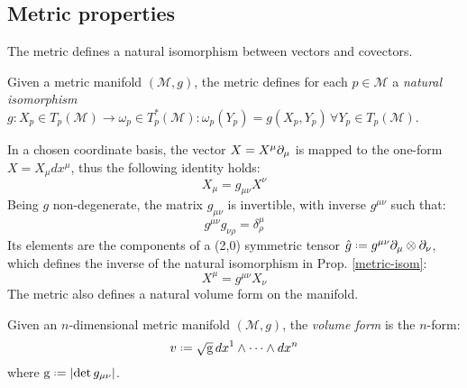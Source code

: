 \subsection{Metric properties}

The metric defines a natural isomorphism between vectors and covectors.

\begin{proposition}\label{metric-isom}
  Given a metric manifold $ (\mathcal{M},g) $, the metric defines for each $ p \in \mathcal{M} $ a \textit{natural isomorphism} $ g : X_p \in T_p (\mathcal{M}) \rightarrow \omega_p \in T^*_p (\mathcal{M}) : \omega_p(Y_p) = g(X_p,Y_p) \,\forall Y_p \in T_p (\mathcal{M}) $.
\end{proposition}

In a chosen coordinate basis, the vector $ X = X^{\mu} \partial_{\mu} $ is mapped to the one-form $ X = X_{\mu} dx^{\mu} $, thus the following identity holds:
\begin{equation}
  X_{\mu} = g_{\mu \nu} X^{\nu}
  \label{eq:3.10}
\end{equation}
Being $ g $ non-degenerate, the matrix $ g_{\mu \nu} $ is invertible, with inverse $ g^{\mu \nu} $ such that:
\begin{equation}
  g^{\mu \nu} g_{\nu \rho} = \delta^{\mu}_{\rho}
  \label{eq:3.11}
\end{equation}
Its elements are the components of a (2,0) symmetric tensor $ \hat{g} \defeq g^{\mu \nu} \pa_{\mu} \otimes \pa_{\nu} $, which defines the inverse of the natural isomorphism in Prop. \ref{metric-isom}:
\begin{equation}
  X^{\mu} = g^{\mu \nu} X_{\nu}
  \label{eq:3.12}
\end{equation}
The metric also defines a natural volume form on the manifold.

\begin{definition}
  Given an $ n $-dimensional metric manifold $ (\mathcal{M},g) $, the \textit{volume form} is the $ n $-form:
  \begin{equation}
    v \defeq \sqg\, dx^1 \wedge \dots \wedge dx^n
    \label{eq:3.13}
  \end{equation}
  where $ \tens{g} \defeq \abs{\det g_{\mu \nu}} $.
\end{definition}

